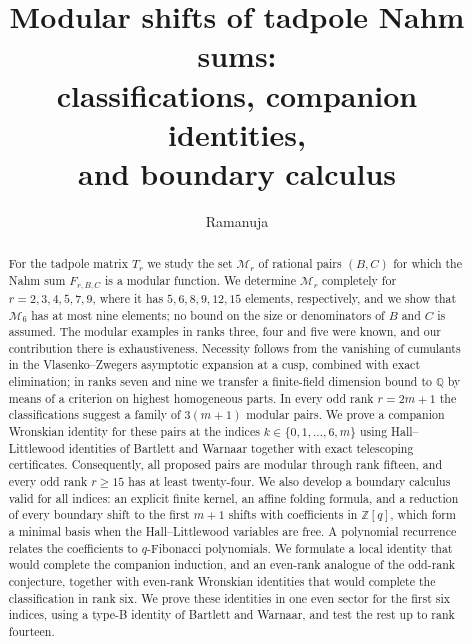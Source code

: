\documentclass[11pt,reqno]{amsart}
\numberwithin{equation}{section}
\theoremstyle{plain}
\theoremstyle{definition}
\theoremstyle{remark}
\newcommand{\Q}{\mathbb{Q}}
\newcommand{\Z}{\mathbb{Z}}
\newcommand{\M}{\mathcal{M}}
\begin{document}
\title[Modular shifts of tadpole Nahm sums]{Modular shifts of tadpole Nahm sums:\\ classifications, companion identities,\\ and boundary calculus}

\author{Ramanuja}
\address{Kachhubi, P.O.\ Tamuria, Lakhnaur Block, Madhubani, Bihar 847410, India}


\begin{abstract}
For the tadpole matrix $T_r$ we study the set $\M_r$ of rational pairs $(B,C)$ for which the Nahm sum $F_{r,B,C}$ is a modular function. We determine $\M_r$ completely for $r=2,3,4,5,7,9$, where it has $5,6,8,9,12,15$ elements, respectively, and we show that $\M_6$ has at most nine elements; no bound on the size or denominators of $B$ and $C$ is assumed. The modular examples in ranks three, four and five were known, and our contribution there is exhaustiveness. Necessity follows from the vanishing of cumulants in the Vlasenko--Zwegers asymptotic expansion at a cusp, combined with exact elimination; in ranks seven and nine we transfer a finite-field dimension bound to $\Q$ by means of a criterion on highest homogeneous parts. In every odd rank $r=2m+1$ the classifications suggest a family of $3(m+1)$ modular pairs. We prove a companion Wronskian identity for these pairs at the indices $k\in\{0,1,\dots,6,m\}$ using Hall--Littlewood identities of Bartlett and Warnaar together with exact telescoping certificates. Consequently, all proposed pairs are modular through rank fifteen, and every odd rank $r\ge 15$ has at least twenty-four. We also develop a boundary calculus valid for all indices: an explicit finite kernel, an affine folding formula, and a reduction of every boundary shift to the first $m+1$ shifts with coefficients in $\Z[q]$, which form a minimal basis when the Hall--Littlewood variables are free. A polynomial recurrence relates the coefficients to $q$-Fibonacci polynomials. We formulate a local identity that would complete the companion induction, and an even-rank analogue of the odd-rank conjecture, together with even-rank Wronskian identities that would complete the classification in rank six. We prove these identities in one even sector for the first six indices, using a type-B identity of Bartlett and Warnaar, and test the rest up to rank fourteen.
\end{abstract}
\end{document}
